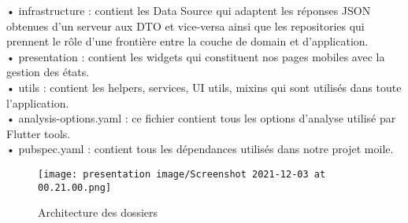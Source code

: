 • infrastructure : contient les Data Source qui adaptent les réponses JSON obtenues d'un serveur aux DTO et vice-versa ainsi que les repositories qui prennent le rôle d’une frontière entre la couche de domain et d’application.\\

• presentation : contient les widgets qui constituent nos pages mobiles avec la gestion des états.\\

• utils : contient les helpers, services, UI utils, mixins qui sont utilisés dans toute l’application.\\

• analysis-options.yaml : ce fichier contient tous les options d’analyse utilisé par Flutter tools.\\

• pubspec.yaml : contient tous les dépendances utilisés dans notre projet moile.

\begin{figure}[!h]
\begin{center}
\texttt{[image: presentation image/Screenshot 2021-12-03 at 00.21.00.png]}
\end{center}
\caption{Architecture des dossiers}
\end{figure}